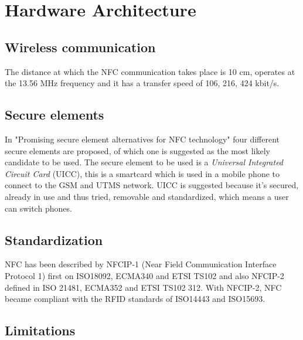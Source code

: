 \chapter{Hardware Architecture}
\label{chap:hardware_architecture}


\section{Wireless communication}
The distance at which the NFC communication takes place is 10 cm, operates at the 13.56 MHz frequency and it has a transfer speed of 106, 216, 424 kbit/s.


\section{Secure elements}
In "Promising secure element alternatives for NFC technology" four different secure elements are proposed, of which one is suggested as the most likely candidate to be used.
The secure element to be used is a \textit{Universal Integrated Circuit Card} (UICC), this is a smartcard which is used in a mobile phone to connect to the GSM and UTMS network. %
UICC is suggested because it's secured, already in use and thus tried, removable and standardized, which means a user can switch phones. 

\section{Standardization}
NFC has been described by NFCIP-1 (Near Field Communication Interface Protocol 1) first on ISO18092, ECMA340 and ETSI TS102 and also NFCIP-2 defined in ISO 21481, ECMA352 and ETSI TS102 312.
With NFCIP-2, NFC became compliant with the RFID standards of ISO14443 and ISO15693.

\section{Limitations}






